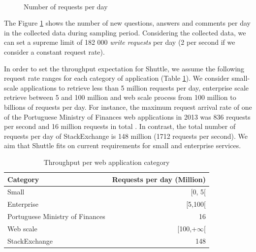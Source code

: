 \begin{figure}[!htb]
  \centering
   \quad
   \\
   \quad
   \quad
  \caption{Number of requests per day}
  \label{fig:stackNetworkRequestRate}
\end{figure} 

The Figure \ref{fig:stackNetworkRequestRate} shows the number of new questions, answers and comments per day in the collected data during sampling period. Considering the collected data, we can set a supreme limit of 182 000 \emph{write requests} per day (2 per second if we consider a constant request rate). 

In order to set the throughput expectation for Shuttle, we assume the following request rate ranges for each category of application (Table \ref{tab:base_throughputs}). We consider small-scale applications to retrieve less than 5 million requests per day, enterprise scale retrieve between 5 and 100 million and web scale process from 100 million to billions of requests per day.
For instance, the maximum request arrival rate of one of the Portuguese Ministry of Finances web applications in 2013 was 836 requests per second and 16 million requests in total \cite{opensoft}. In contrast, the total number of requests per day of StackExchange is 148 million (1712 requests per second). We aim that Shuttle fits on current requirements for small and enterprise services. 

\begin{table}[ht]
    \centering
    \begin{tabular}{lr}
      \bf{Category}                          & \bf{Requests per day (Million)}  \\ \hline
      Small                                  & [0, 5[                           \\
      Enterprise                             & [5,100[                          \\
      Portuguese Ministry of Finances        & 16                               \\
      Web scale                              & [100,+$\infty$[                  \\
      StackExchange                          & 148                              \\
    \end{tabular}
    \caption{Throughput per web application category}
    \label{tab:base_throughputs}
\end{table}


